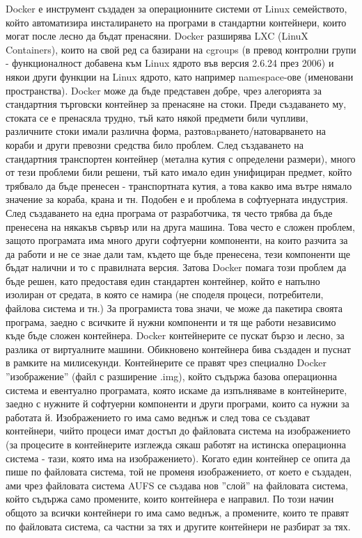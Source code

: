 \documentclass[pdftex,14pt,a4paper]{extreport}
\begin{document}
Docker е инструмент създаден за операционните системи от Linux семейството, който автоматизира инсталирането на програми в стандартни контейнери, които могат после лесно да бъдат пренасяни. Docker разширява LXC (LinuX Containers), които на свой ред са базирани на cgroups (в превод контролни групи - функционалност добавена към Linux ядрото във версия 2.6.24 през 2006) и някои други функции на Linux ядрото, като например namespace-ове (именовани пространства). Docker може да бъде представен добре, чрез алегорията за стандартния търговски контейнер за пренасяне на стоки. Преди създаването му, стоката се е пренасяла трудно, тъй като някой предмети били чупливи, различните стоки имали различна форма, разтовapването/натоварването на кораби и други превозни средства било проблем. След създаването на стандартния транспортен контейнер (метална кутия с определени размери), много от тези проблеми били решени, тъй като имало един унифициран предмет, който трябвало да бъде пренесен - транспортната кутия, а това какво има вътре нямало значение за кораба, крана и тн. Подобен е и проблема в софтуерната индустрия. След създаването на една програма от разработчика, тя често трябва да бъде пренесена на някакъв сървър или на друга машина. Това често е сложен проблем, защото програмата има много други софтуерни компоненти, на които разчита за да работи и не се знае дали там, където ще бъде пренесена, тези компоненти ще бъдат налични и то с правилната версия. Затова Docker помага този проблем да бъде решен, като предоставя един стандартен контейнер, който е напълно изолиран от средата, в която се намира (не споделя процеси, потребители, файлова система и тн.) За програмиста това значи, че може да пакетира своята програма, заедно с всичките й нужни компоненти и тя ще работи независимо къде бъде сложен контейнера. Docker контейнерите се пускат бързо и лесно, за разлика от виртуалните машини. Обикновено контейнера бива създаден и пуснат в рамките на милисекунди. Контейнерите се правят чрез специално Docker ''изображение'' (файл с разширение .img), който съдържа базова операционна система и евентуално програмата, която искаме да изпълняваме в контейнерите, заедно с нужните й софтуерни компоненти и други програми, които са нужни за работата й. Изображението го има само веднъж и след това се създават контейнери, чийто процеси имат достъп до файловата система на изображението (за процесите в контейнерите изглежда сякаш работят на истинска операционна система - тази, която има на изображението). Когато един контейнер се опита да пише по файловата система, той не променя изображението, от което е създаден, ами чрез файловата система AUFS се създава нов ''слой'' на файловата система, който съдържа само промените, които контейнера е направил. По този начин общото за всички контейнери го има само веднъж, а промените, които те правят по файловата система, са частни за тях и другите контейнери не разбират за тях. \\\\
\end{document}
